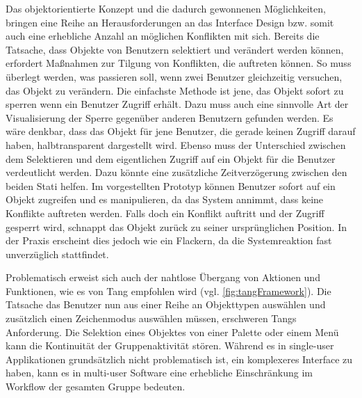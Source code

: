 \medskip Das objektorientierte Konzept und die dadurch gewonnenen Möglichkeiten, bringen eine Reihe an Herausforderungen an das Interface Design bzw. somit auch eine erhebliche Anzahl an möglichen Konflikten mit sich. Bereits die Tatsache, dass Objekte von Benutzern selektiert und verändert werden können, erfordert Maßnahmen zur Tilgung von Konflikten, die auftreten können. So muss überlegt werden, was passieren soll, wenn zwei Benutzer gleichzeitig versuchen, das Objekt zu verändern. Die einfachste Methode ist jene, das Objekt sofort zu sperren wenn ein Benutzer Zugriff erhält.  
Dazu muss auch eine sinnvolle Art der Visualisierung der Sperre gegenüber anderen Benutzern gefunden werden. Es wäre denkbar, dass das Objekt für jene Benutzer, die gerade keinen Zugriff darauf haben, halbtransparent dargestellt wird. Ebenso muss der Unterschied zwischen dem Selektieren und dem eigentlichen Zugriff auf ein Objekt für die Benutzer verdeutlicht werden. Dazu könnte eine zusätzliche Zeitverzögerung zwischen den beiden Stati helfen. Im vorgestellten Prototyp können Benutzer sofort auf ein Objekt zugreifen und es manipulieren, da das System annimmt, dass keine Konflikte auftreten werden. Falls doch ein Konflikt auftritt und der Zugriff gesperrt wird, schnappt das Objekt zurück zu seiner ursprünglichen Position. In der Praxis erscheint dies jedoch wie ein Flackern, da die Systemreaktion fast unverzüglich stattfindet. 

\medskip Problematisch erweist sich auch der nahtlose Übergang von Aktionen und Funktionen, wie es von Tang \citep{TangJC:1989} empfohlen wird (vgl. \autoref{fig:tangFramework}). Die Tatsache das Benutzer nun aus einer Reihe an Objekttypen auswählen und zusätzlich einen Zeichenmodus auswählen müssen, erschweren Tangs Anforderung. Die Selektion eines Objektes von einer Palette oder einem Menü kann die Kontinuität der Gruppenaktivität stören. Während es in single-user Applikationen grundsätzlich nicht problematisch ist, ein komplexeres Interface zu haben, kann es in multi-user Software eine erhebliche Einschränkung im Workflow der gesamten Gruppe bedeuten. 

